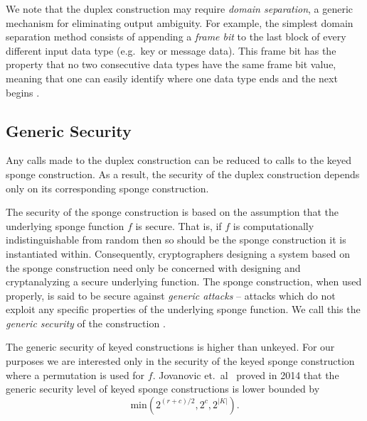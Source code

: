 We note that the duplex construction may require \emph{domain separation}, a generic mechanism for eliminating output ambiguity.
For example, the simplest domain separation method consists of appending a \emph{frame bit} to the last block of every different input data type (e.g.\ key or message data).
This frame bit has the property that no two consecutive data types have the same frame bit value, meaning that one can easily identify where one data type ends and the next begins \cite{Bertoni2012_Duplexing}.

\subsection{Generic Security}
\label{sec:DuplexSecurity}
Any calls made to the duplex construction can be reduced to calls to the keyed sponge construction.
As a result, the security of the duplex construction depends only on its corresponding sponge construction.

The security of the sponge construction is based on the assumption that the underlying sponge function $f$ is secure.
That is, if $f$ is computationally indistinguishable from random then so should be the sponge construction it is instantiated within.
Consequently, cryptographers designing a system based on the sponge construction need only be concerned with designing and cryptanalyzing a secure underlying function.
The sponge construction, when used properly, is said to be secure against \emph{generic attacks} -- attacks which do not exploit any specific properties of the underlying sponge function.
We call this the \emph{generic security} of the construction \cite{Bertoni2011_SpongeFunctions}.

The generic security of keyed constructions is higher than unkeyed.
For our purposes we are interested only in the security of the keyed sponge construction where a permutation is used for $f$. 
Jovanovic et.~al\ \cite{Jovanovic2014_Beyond} proved in 2014 that the generic security level of keyed sponge constructions is lower bounded by 
\begin{equation*}
\mathrm{min}(2^{(r+c)/2}, 2^c, 2^{|K|}).
\end{equation*} 

